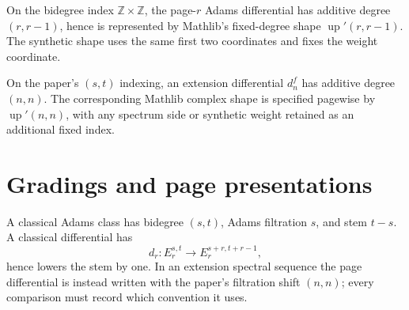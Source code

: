 \begin{definition}
  \label{def:adams-complex-shape}
  \notready
  On the bidegree index $\mathbb Z\times\mathbb Z$, the page-$r$ Adams
  differential has additive degree $(r,r-1)$, hence is represented by
  Mathlib's fixed-degree shape $\operatorname{up}'(r,r-1)$.  The synthetic
  shape uses the same first two coordinates and fixes the weight coordinate.
\end{definition}

\begin{definition}
  \label{def:ess-complex-shape}
  \notready
  On the paper's $(s,t)$ indexing, an extension differential $d_n^f$ has
  additive degree $(n,n)$.  The corresponding Mathlib complex shape is
  specified pagewise by $\operatorname{up}'(n,n)$, with any spectrum side or
  synthetic weight retained as an additional fixed index.
\end{definition}

\section{Gradings and page presentations}

\begin{definition}
  \label{def:adams-bidegree}
  \notready
  A classical Adams class has bidegree $(s,t)$, Adams filtration $s$, and stem
  $t-s$.  A classical differential has
  \[
    d_r:E_r^{s,t}\longrightarrow E_r^{s+r,t+r-1},
  \]
  hence lowers the stem by one.  In an extension spectral sequence the page
  differential is instead written with the paper's filtration shift
  $(n,n)$; every comparison must record which convention it uses.
\end{definition}

